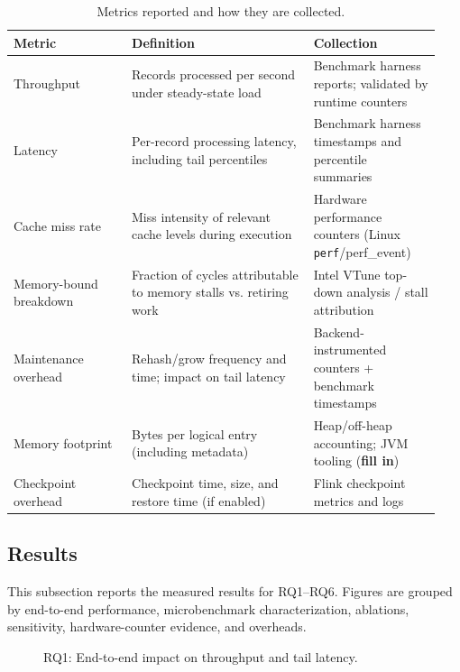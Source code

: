 \documentclass[sigconf]{acmart}
\begin{document}
\begin{table}[t]
  \caption{Metrics reported and how they are collected.}
  \label{tab:metrics}
  \centering
  \begin{tabular}{p{0.26\linewidth}p{0.40\linewidth}p{0.28\linewidth}}
    \toprule
    \textbf{Metric} & \textbf{Definition} & \textbf{Collection} \\
    \midrule
    Throughput & Records processed per second under steady-state load & Benchmark harness reports; validated by runtime counters \\
    Latency & Per-record processing latency, including tail percentiles & Benchmark harness timestamps and percentile summaries \\
    Cache miss rate & Miss intensity of relevant cache levels during execution & Hardware performance counters (Linux \texttt{perf}/perf\_event) \\
    Memory-bound breakdown & Fraction of cycles attributable to memory stalls vs. retiring work & Intel VTune top-down analysis / stall attribution \\
    Maintenance overhead & Rehash/grow frequency and time; impact on tail latency & Backend-instrumented counters + benchmark timestamps \\
    Memory footprint & Bytes per logical entry (including metadata) & Heap/off-heap accounting; JVM tooling (\textbf{fill in}) \\
    Checkpoint overhead & Checkpoint time, size, and restore time (if enabled) & Flink checkpoint metrics and logs \\
    \bottomrule
  \end{tabular}
\end{table}

\subsection{Results}
\label{sec:eval-results}
This subsection reports the measured results for RQ1--RQ6. Figures are grouped by end-to-end performance, microbenchmark characterization, ablations, sensitivity, hardware-counter evidence, and overheads.

\begin{figure}[t]
  \centering
  \caption{RQ1: End-to-end impact on throughput and tail latency.}
  \label{fig:rq1-e2e}
\end{figure}
\end{document}
